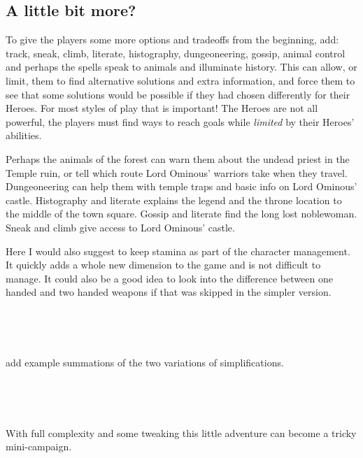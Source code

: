 \subsection*{A little bit more?}
To give the players some more options and tradeoffs from the beginning,
add: track, sneak, climb, literate, histography, dungeoneering, gossip, animal control and perhaps the spells speak to animals and illuminate history. This can allow, or limit, them to find alternative solutions and extra information, and force them to see that some solutions would be possible if they had chosen differently for their Heroes. For most styles of play that is important! The Heroes are not all powerful, the players must find ways to reach goals while \emph{limited} by their Heroes' abilities.

Perhaps the animals of the forest can warn them about the undead priest in the Temple ruin, or tell which route Lord Ominous' warriors take when they travel. Dungeoneering can help them with temple traps and basic info on Lord Ominous' castle. Histography and literate explains the legend and the throne location to the middle of the town square. Gossip and literate find the long lost noblewoman. Sneak and climb give access to Lord Ominous' castle.

Here I would also suggest to keep stamina as part of the character management. It quickly adds a whole new dimension to the game and is not difficult to manage. It could also be a good idea to look into the difference between one handed and two handed weapons if that was skipped in the simpler version.

\

\

\todo add example summations of the two variations of simplifications.

\

\

With full complexity and some tweaking this little adventure can become a tricky mini-campaign.
















\clearpage
